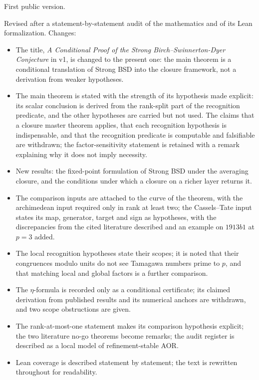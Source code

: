 \begin{description}[leftmargin=2.4em, style=nextline]
\item[v1, 31 August 2026] First public version.
\item[v2, 4 October 2026] Revised after a statement-by-statement audit
  of the mathematics and of its Lean formalization.  Changes:
  \begin{itemize}
  \item The title, \emph{A Conditional Proof of the Strong
    Birch--Swinnerton-Dyer Conjecture} in v1, is changed to the present
    one: the main theorem is a conditional translation of Strong BSD into
    the closure framework, not a derivation from weaker hypotheses.
  \item The main theorem is stated with the strength of its hypothesis
    made explicit: its scalar conclusion is derived from the rank-split
    part of the recognition predicate, and the other hypotheses are
    carried but not used.  The claims that a closure master theorem
    applies, that each recognition hypothesis is indispensable, and that
    the recognition predicate is computable and falsifiable are
    withdrawn; the factor-sensitivity statement is retained with a remark
    explaining why it does not imply necessity.
  \item New results: the fixed-point formulation of Strong BSD under the
    averaging closure, and the conditions under which a closure on a
    richer layer returns it.
  \item The comparison inputs are attached to the curve of the theorem,
    with the archimedean input required only in rank at least two; the
    Cassels--Tate input states its map, generator, target and sign as
    hypotheses, with the discrepancies from the cited literature
    described and an example on $1913b1$ at $p=3$ added.
  \item The local recognition hypotheses state their scopes; it is noted
    that their congruences modulo units do not see Tamagawa numbers prime
    to $p$, and that matching local and global factors is a further
    comparison.
  \item The $\eta$-formula is recorded only as a conditional certificate;
    its claimed derivation from published results and its numerical
    anchors are withdrawn, and two scope obstructions are given.
  \item The rank-at-most-one statement makes its comparison hypothesis
    explicit; the two literature no-go theorems become remarks; the audit
    register is described as a local model of refinement-stable AOR.
  \item Lean coverage is described statement by statement; the text is
    rewritten throughout for readability.
  \end{itemize}
\end{description}
